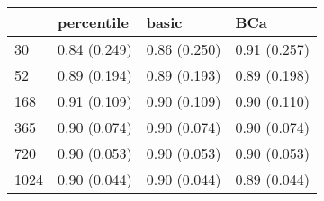 \begin{tabular}{llll}
\toprule
 & percentile & basic & BCa \\
\midrule
30 & 0.84 (0.249) & 0.86 (0.250) & 0.91 (0.257) \\
52 & 0.89 (0.194) & 0.89 (0.193) & 0.89 (0.198) \\
168 & 0.91 (0.109) & 0.90 (0.109) & 0.90 (0.110) \\
365 & 0.90 (0.074) & 0.90 (0.074) & 0.90 (0.074) \\
720 & 0.90 (0.053) & 0.90 (0.053) & 0.90 (0.053) \\
1024 & 0.90 (0.044) & 0.90 (0.044) & 0.89 (0.044) \\
\bottomrule
\end{tabular}
